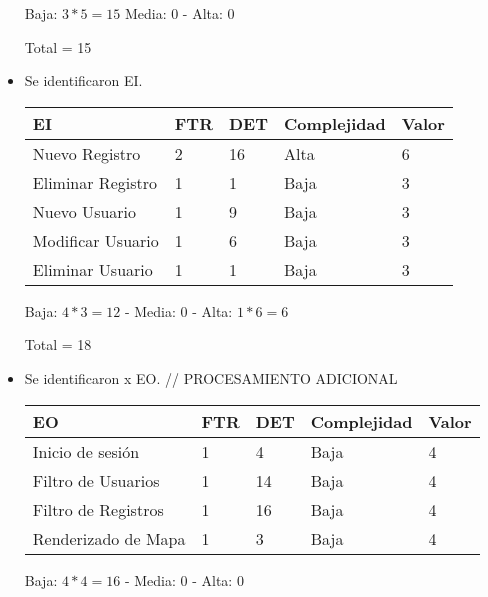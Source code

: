 \begin{itemize}
    Baja: $3 * 5 = 15$
    Media: 0 -
    Alta: 0
    
    Total = 15

    \item Se identificaron  EI.
    
    \begin{table}[H]
        \centering
        \begin{tabular}{|l|l|l|l|l|}
            \hline
            EI                 & FTR & DET & Complejidad & Valor \\ \hline
            Nuevo Registro     & 2   & 16  & Alta        & 6     \\ \hline
            Eliminar Registro  & 1   & 1   & Baja        & 3     \\ \hline
            Nuevo Usuario      & 1   & 9   & Baja        & 3     \\ \hline
            Modificar Usuario  & 1   & 6   & Baja        & 3     \\ \hline
            Eliminar Usuario   & 1   & 1   & Baja        & 3     \\ \hline
        \end{tabular}
    \end{table}
    
    Baja: $4 * 3 = 12$ -
    Media: 0 -
    Alta: $1 * 6 = 6$

    Total = 18

    \item Se identificaron x EO. // PROCESAMIENTO ADICIONAL
    
    \begin{table}[H]
        \centering
        \begin{tabular}{|l|l|l|l|l|}
            \hline
            EO                      & FTR & DET  & Complejidad & Valor \\ \hline
            Inicio de sesión        & 1   & 4    & Baja        & 4     \\ \hline
            Filtro de Usuarios      & 1   & 14   & Baja        & 4     \\ \hline
            Filtro de Registros     & 1   & 16   & Baja        & 4     \\ \hline
            Renderizado de Mapa     & 1   & 3    & Baja        & 4     \\
            \hline
        \end{tabular}
    \end{table}
    
    Baja: $4 * 4 = 16$ -
    Media: 0 -
    Alta: 0 


\end{itemize}
